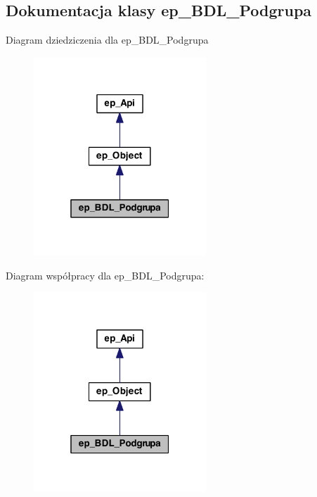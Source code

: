 \hypertarget{classep___b_d_l___podgrupa}{\subsection{Dokumentacja klasy ep\-\_\-\-B\-D\-L\-\_\-\-Podgrupa}
\label{classep___b_d_l___podgrupa}
}


Diagram dziedziczenia dla ep\-\_\-\-B\-D\-L\-\_\-\-Podgrupa\nopagebreak
\begin{figure}[H]
\begin{center}
\leavevmode
\includegraphics[width=184pt]{classep___b_d_l___podgrupa__inherit__graph}
\end{center}
\end{figure}


Diagram współpracy dla ep\-\_\-\-B\-D\-L\-\_\-\-Podgrupa\-:\nopagebreak
\begin{figure}[H]
\begin{center}
\leavevmode
\includegraphics[width=184pt]{classep___b_d_l___podgrupa__coll__graph}
\end{center}
\end{figure}
